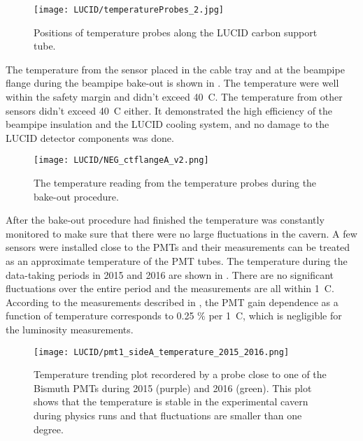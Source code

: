 \begin{figure}
\centering
\texttt{[image: LUCID/temperatureProbes\_2.jpg]}
\caption{Positions of temperature probes along the LUCID carbon support tube.}
\label{fig:temperatureProbes_VJCone}
\end{figure}

The temperature from the sensor placed in the cable tray and at the beampipe flange during the beampipe bake-out is shown in .
The temperature were well within the safety margin and didn't exceed 40\degree~C. The temperature from other sensors didn't exceed 40\degree~C either.
It demonstrated the high efficiency of the beampipe insulation and the LUCID cooling system, and no damage to the LUCID detector components was done.

\begin{figure}
\centering
\texttt{[image: LUCID/NEG\_ctflangeA\_v2.png]}
\caption{The temperature reading from the temperature probes during the bake-out procedure.}
\label{fig:NEG_ctflangeA}
\end{figure}
 
After the bake-out procedure had finished the temperature was constantly monitored to make sure that there were no large fluctuations in the cavern.
A few sensors were installed close to the PMTs and their measurements can be treated as an approximate temperature of the PMT tubes.
The temperature during the data-taking periods in 2015 and 2016 are shown in . 
There are no significant fluctuations over the entire period and the measurements are all within 1\degree~C.
According to the measurements described in , the PMT gain dependence as a function of temperature corresponds
to 0.25 $\%$ per 1\degree~C, which is negligible for the luminosity measurements.

\begin{figure}
\centering
\texttt{[image: LUCID/pmt1\_sideA\_temperature\_2015\_2016.png]}
\caption{Temperature trending plot recordered by a probe close to one of the Bismuth PMTs
during 2015 (purple) and 2016 (green). This plot shows that the temperature is stable in 
the experimental cavern during physics runs and that fluctuations are smaller than one degree.}
\label{fig:tempTrendingPlot}
\end{figure}

